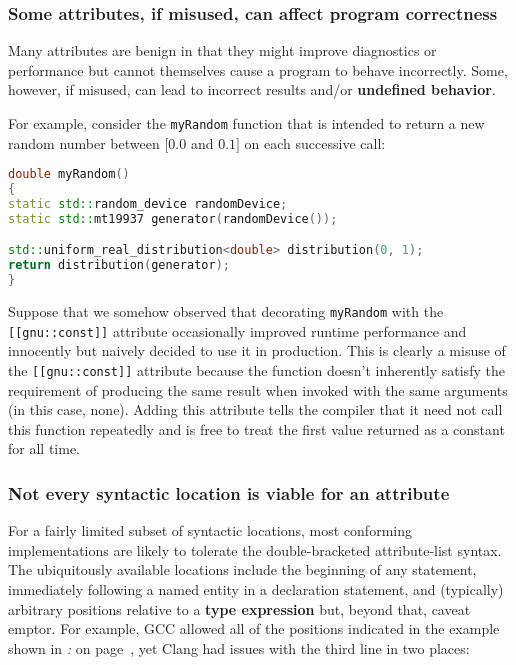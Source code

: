 \subsubsection[Some attributes, if misused, can affect program correctness]{Some attributes, if misused, can affect program correctness}\label{some-attributes,-if-misused,-can-affect-program-correctness}

Many attributes are benign in that they might improve diagnostics or
performance but cannot themselves cause a program to behave incorrectly.
Some, however, if misused, can lead to incorrect
results and/or \textbf{undefined behavior}.

For example, consider the \texttt{myRandom} function that is intended to
return a new random number between $[0.0$ and $0.1]$ on each successive
call:

\begin{lstlisting}[language=C++]
double myRandom()
{
static std::random_device randomDevice;
static std::mt19937 generator(randomDevice());

std::uniform_real_distribution<double> distribution(0, 1);
return distribution(generator);
}
\end{lstlisting}

\noindent Suppose that we somehow observed that decorating \texttt{myRandom} with
the \texttt{[[gnu::const]]} attribute occasionally improved runtime
performance and innocently but naively decided to use it in production. This
is clearly a misuse of the \texttt{[[gnu::const]]} attribute because the
function doesn't inherently satisfy the requirement of producing the
same result when invoked with the same arguments (in this case, none).
Adding this attribute tells the compiler that it need not call this
function repeatedly and is free to treat the first value returned as a
constant for all time.

\subsubsection[Not every syntactic location is viable for an attribute]{Not every syntactic location is viable for an attribute}\label{not-every-syntactic-location-is-viable-for-an-attribute}

For a fairly limited subset of syntactic locations, most
conforming implementations are likely to tolerate the double-bracketed
attribute-list syntax. The ubiquitously available locations include the
beginning of any statement, immediately following a named entity in a
declaration statement, and (typically) arbitrary positions relative to a
\textbf{type expression} but, beyond that, caveat emptor. For example, GCC
allowed all of the positions indicated in the example shown in
{\it{}:} {\it{}} on page~\pageref{attribute-gcc-example}, yet Clang had
issues with the third line in two places:

